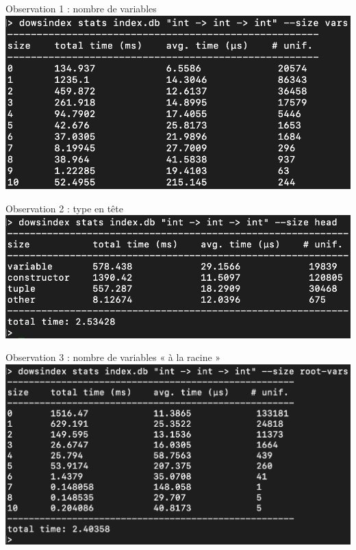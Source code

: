 \documentclass[serif]{beamer}
\newcommand{\?}{\stackrel{?}{=}}
\begin{document}
\begin{frame}{Observation 1 : nombre de variables}
	\includegraphics[scale=0.32,center]{images/stats1}
\end{frame}


\begin{frame}{Observation 2 : type en tête}
	\includegraphics[scale=0.32,center]{images/stats2}
\end{frame}


\begin{frame}{Observation 3 : nombre de variables « à la racine »}
	\includegraphics[scale=0.32,center]{images/stats3}
\end{frame}
\end{document}
